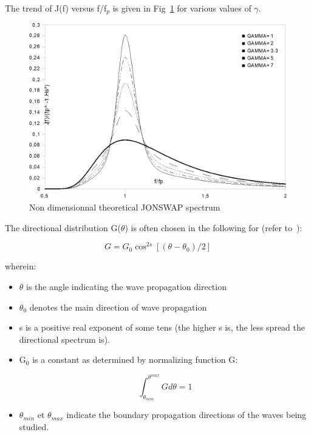 The trend of J(f) versus f/f${}_{p}$ is given in Fig~\ref{fig:jonswap} for various values of $\gamma$.


\begin{figure}[H]%
\begin{center}
%
  \includegraphics[width=\textwidth]{./graphics/jonswap}
%
\caption{Non dimensionnal theoretical JONSWAP spectrum}\label{fig:jonswap}
\end{center}
\end{figure}

The directional distribution G($\theta$) is often chosen in the following for
(refer to~\cite{Goda2000}):


\begin{equation}
  G = G_0 \cos^{2s}[(\theta-\theta_0)/2]
  \label{eq:3.65}
\end{equation}

wherein:
\begin{itemize}
  \item $\theta$ is the angle indicating the wave propagation direction

  \item $\theta_{0}$ denotes the main direction of wave propagation

  \item s is a positive real exponent of some tens (the higher s is, the less
    spread the directional spectrum is).

  \item G${}_{0}$ is a constant as determined by normalizing function G:

    \[ \int_{\theta_{min}}^{\theta^{max}}Gd\theta = 1  \]

  \item $\theta_{min}$ et $\theta_{max}$ indicate the boundary propagation
    directions of the waves being studied.

\end{itemize}

